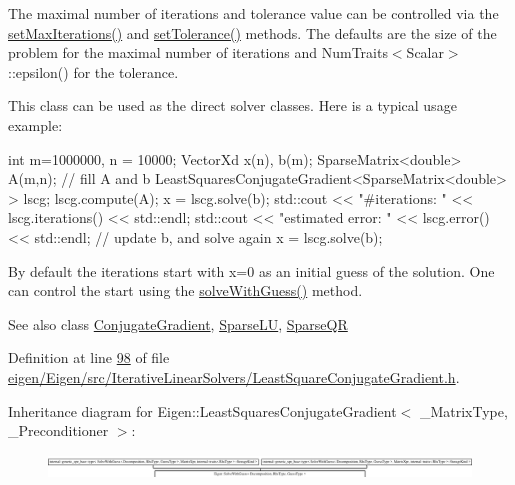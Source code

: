 The maximal number of iterations and tolerance value can be controlled via the \hyperlink{group___iterative_linear_solvers___module_af83de7a7d31d9d4bd1fef6222b07335b}{set\+Max\+Iterations()} and \hyperlink{group___iterative_linear_solvers___module_ac160a444af8998f93da9aa30e858470d}{set\+Tolerance()} methods. The defaults are the size of the problem for the maximal number of iterations and Num\+Traits$<$\+Scalar$>$\+::epsilon() for the tolerance.

This class can be used as the direct solver classes. Here is a typical usage example\+: 
\begin{DoxyCode}
\textcolor{keywordtype}{int} m=1000000, n = 10000;
VectorXd x(n), b(m);
SparseMatrix<double> A(m,n);
\textcolor{comment}{// fill A and b}
LeastSquaresConjugateGradient<SparseMatrix<double> > lscg;
lscg.compute(A);
x = lscg.solve(b);
std::cout << \textcolor{stringliteral}{"#iterations:     "} << lscg.iterations() << std::endl;
std::cout << \textcolor{stringliteral}{"estimated error: "} << lscg.error()      << std::endl;
\textcolor{comment}{// update b, and solve again}
x = lscg.solve(b);
\end{DoxyCode}


By default the iterations start with x=0 as an initial guess of the solution. One can control the start using the \hyperlink{group___iterative_linear_solvers___module_adcc18d1ab283786dcbb5a3f63f4b4bd8}{solve\+With\+Guess()} method.

\begin{DoxySeeAlso}{See also}
class \hyperlink{group___iterative_linear_solvers___module_class_eigen_1_1_conjugate_gradient}{Conjugate\+Gradient}, \hyperlink{group___sparse_l_u___module_class_eigen_1_1_sparse_l_u}{Sparse\+LU}, \hyperlink{group___sparse_q_r___module_class_eigen_1_1_sparse_q_r}{Sparse\+QR} 
\end{DoxySeeAlso}


Definition at line \hyperlink{eigen_2_eigen_2src_2_iterative_linear_solvers_2_least_square_conjugate_gradient_8h_source_l00098}{98} of file \hyperlink{eigen_2_eigen_2src_2_iterative_linear_solvers_2_least_square_conjugate_gradient_8h_source}{eigen/\+Eigen/src/\+Iterative\+Linear\+Solvers/\+Least\+Square\+Conjugate\+Gradient.\+h}.

Inheritance diagram for Eigen\+:\+:Least\+Squares\+Conjugate\+Gradient$<$ \+\_\+\+Matrix\+Type, \+\_\+\+Preconditioner $>$\+:\begin{figure}[H]
\begin{center}
\leavevmode
\includegraphics[height=0.618375cm]{group___iterative_linear_solvers___module}
\end{center}
\end{figure}
